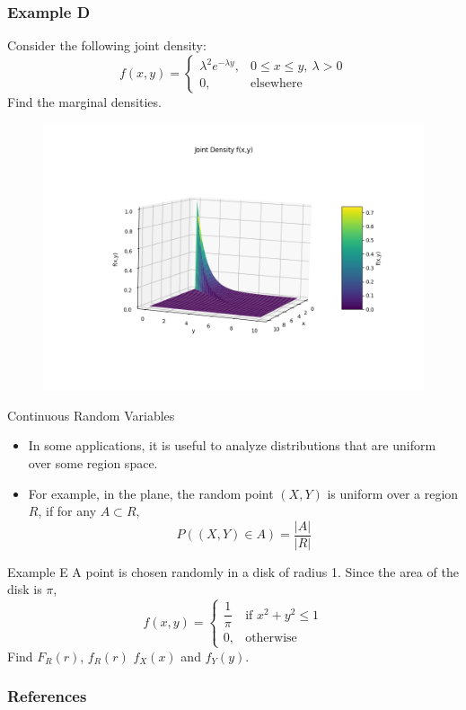 \documentclass{beamer}
\begin{document}
\begin{frame}
    \frametitle{Example D}

    Consider the following joint density:
    \[f(x,y)= \begin{cases}
        \lambda^2 e^{-\lambda y}, & 0 \leq x \leq y, ~\lambda >0\\
        0, & \text{elsewhere}
    \end{cases}\] Find the marginal densities. 
    \begin{figure}
        \includegraphics[scale=0.4]{Figures/fig_9.png}
    \end{figure}
    

\end{frame}

\begin{frame}{Continuous Random Variables}
    \begin{itemize}
        \item In some applications, it is useful to analyze distributions that are uniform over some region space. 
        \item For example, in the plane, the random point \((X,Y)\) is uniform over a region \(R\), if for any \(A \subset R\), \[P((X,Y) \in A)=\dfrac{|A|}{|R|}\]
    \end{itemize}    
\end{frame}

\begin{frame}{Example E}
    A point is chosen randomly in a disk of radius 1. Since the area of the disk is \(\pi\), \[f(x,y)= \begin{cases}
        \dfrac{1}{\pi} & \text{if }x^2+y^2\leq 1\\
        0, & \text{otherwise}
    \end{cases}\] Find \(F_R(r)\), \(f_R(r)\)  \(f_X(x)\) and \(f_Y(y)\). 
\end{frame}




\begin{frame}
    \frametitle{References}
\end{frame}
\end{document}
